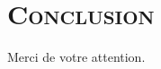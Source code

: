 \documentclass[xcolor=x11names,compress]{beamer}
\renewcommand{\(}{\begin{columns}} \renewcommand{\)}{\end{columns}}
\newcommand{\<}[1]{\begin{column}{#1}} \renewcommand{\>}{\end{column}}
\begin{document}

\section{\scshape Conclusion}

\begin{frame}{}
\begin{center}
\huge Merci de votre attention.
\end{center}
\end{frame}

\appendix
\end{document}

